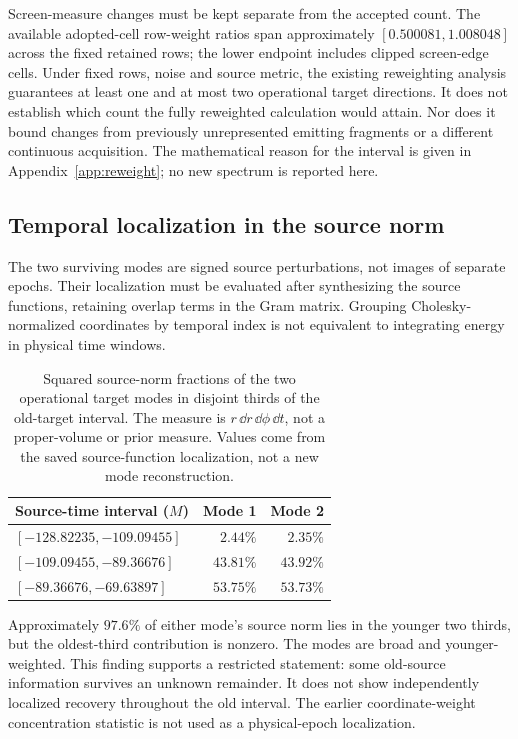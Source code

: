Screen-measure changes must be kept separate from the accepted count. The available adopted-cell row-weight ratios span approximately $[0.500081,1.008048]$ across the fixed retained rows; the lower endpoint includes clipped screen-edge cells. Under fixed rows, noise and source metric, the existing reweighting analysis guarantees at least one and at most two operational target directions. It does not establish which count the fully reweighted calculation would attain. Nor does it bound changes from previously unrepresented emitting fragments or a different continuous acquisition. The mathematical reason for the interval is given in Appendix~\ref{app:reweight}; no new spectrum is reported here.

\subsection{Temporal localization in the source norm}
The two surviving modes are signed source perturbations, not images of separate epochs. Their localization must be evaluated after synthesizing the source functions, retaining overlap terms in the Gram matrix. Grouping Cholesky-normalized coordinates by temporal index is not equivalent to integrating energy in physical time windows.

\begin{table}[htbp]
\centering\small
\caption{Squared source-norm fractions of the two operational target modes in disjoint thirds of the old-target interval. The measure is $r\,\dd r\,\dd\phi\,\dd t$, not a proper-volume or prior measure. Values come from the saved source-function localization, not a new mode reconstruction.}
\label{tab:localization}
\begin{tabular}{l r r}
\toprule
Source-time interval ($M$)&Mode 1&Mode 2\\
\midrule
$[-128.82235,-109.09455]$&$2.44\%$&$2.35\%$\\
$[-109.09455,-89.36676]$&$43.81\%$&$43.92\%$\\
$[-89.36676,-69.63897]$&$53.75\%$&$53.73\%$\\
\bottomrule
\end{tabular}
\end{table}

Approximately $97.6\%$ of either mode's source norm lies in the younger two thirds, but the oldest-third contribution is nonzero. The modes are broad and younger-weighted. This finding supports a restricted statement: some old-source information survives an unknown remainder. It does not show independently localized recovery throughout the old interval. The earlier coordinate-weight concentration statistic is not used as a physical-epoch localization.

